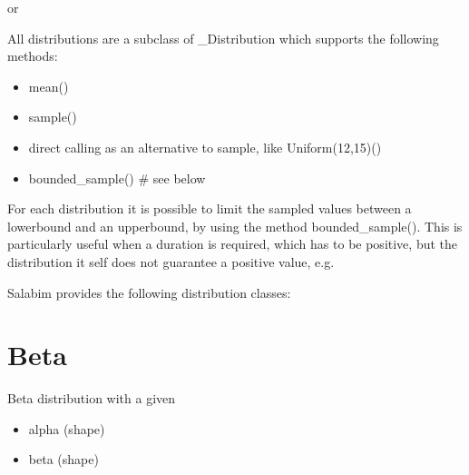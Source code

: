 \documentclass[letterpaper,10pt,english]{sphinxmanual}
\begin{document}
\begin{sphinxVerbatim}[commandchars=\\\{\}]
 
\end{sphinxVerbatim}

or

\begin{sphinxVerbatim}[commandchars=\\\{\}]
 
\end{sphinxVerbatim}

All distributions are a subclass of \_Distribution which supports the following methods:
\begin{itemize}
\item {} 
mean()

\item {} 
sample()

\item {} 
direct calling as an alternative to sample, like Uniform(12,15)()

\item {} 
bounded\_sample()  \# see below

\end{itemize}

For each distribution it is possible to limit the sampled values between a lowerbound and an upperbound, by using
the method bounded\_sample(). This is particularly useful when a duration is required, which has to be positive, but the distribution
it self does not guarantee a positive value, e.g.

\begin{sphinxVerbatim}[commandchars=\\\{\}]
  
\end{sphinxVerbatim}

Salabim provides the following distribution classes:


\section{Beta}
\label{\detokenize{Distributions:beta}}
Beta distribution with a given
\begin{itemize}
\item {} 
alpha (shape)

\item {} 
beta (shape)

\end{itemize}
\end{document}
